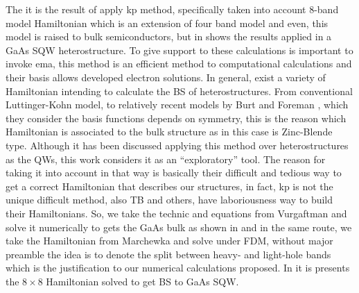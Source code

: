The  it is the result of apply \gls{kp} method, specifically taken into account 8-band model Hamiltonian\cite{kane1957bandstructure,galeriu2005k,vurgaftman2020bands} which is an extension of four band model\cite{galeriu2005k} and even, this model is raised to bulk semiconductors, but in  shows the results applied in a GaAs SQW heterostructure. To give support to these calculations is important to invoke \gls{ema}, this method is an efficient method to computational calculations\cite{yeo2020first,harrison2016quantum} and their basis allows developed electron solutions. In general,  exist a variety of Hamiltonian intending to calculate the \gls{BS} of heterostructures. From conventional Luttinger-Kohn model, \cite{Luttinger1955motion} to relatively recent models by Burt and Foreman \cite{burt1988aneweffective,foreman1993effective,burt1992justification}, which they consider the basis functions depends on symmetry, this is the reason which  Hamiltonian is associated to the bulk structure as in this case is Zinc-Blende type. 
Although it has been discussed applying this method over heterostructures as the QWs, this work considers it as an ``exploratory'' tool. The reason for taking it into account in that way is basically their difficult and tedious way to get a correct Hamiltonian that describes our structures, in fact, \gls{kp} is not the unique difficult method, also \gls{TB} and others, have laboriousness way to build their Hamiltonians. So, we take the technic and equations from Vurgaftman \cite{vurgaftman2020bands} and solve it numerically to gets the GaAs bulk as shown in  and in the same route, we take the Hamiltonian from Marchewka\cite{marchewka2017finite,novik2005bandstructure} and solve under \gls{FDM}, without major preamble the idea is to denote the split between heavy- and light-hole bands which is the justification to our numerical calculations proposed. In  it is presents the $8\times 8$ Hamiltonian solved to get \gls{BS} to GaAs SQW.
